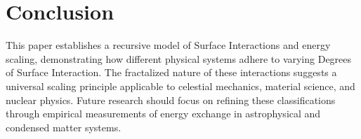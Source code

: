 \documentclass{article}
\begin{document}
\section{Conclusion}
This paper establishes a recursive model of Surface Interactions and energy scaling, demonstrating how different physical systems adhere to varying Degrees of Surface Interaction. The fractalized nature of these interactions suggests a universal scaling principle applicable to celestial mechanics, material science, and nuclear physics. Future research should focus on refining these classifications through empirical measurements of energy exchange in astrophysical and condensed matter systems.
\end{document}

